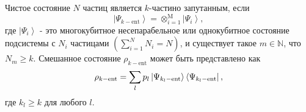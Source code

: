 Чистое состояние $N$ частиц является $k$-частино запутанным, если
%
\begin{equation}
  \left| \Psi_{k-\mathrm{ent}} \right\rangle
  = \otimes^\mathrm{M}_{i=1} \left| \Psi_{i} \right\rangle,
\end{equation}
%
где $\left| \Psi_{i} \right\rangle$ - это многокубитное несепарабельное или однокубитное состояние подсистемы с $N_i$ частицами
$\left( \sum_{i=1}^N N_i = N \right)$,
и существует такое  $ m \in \mathbb{N}$, что $N_{m} \ge k$.
Смешанное состояние $\rho_{k-\mathrm{ent}}$ может быть представлено как
%
\begin{equation}
  \rho_{k-\mathrm{ent}} =
  \sum\limits_{l} p_l \left| \Psi_{k_l-\mathrm{ent}} \right\rangle\left\langle \Psi_{k_l-\mathrm{ent}} \right|,
  \end{equation}
%
где $k_l \geq k$ для любого $l$.
